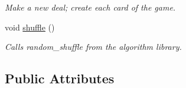 \begin{DoxyCompactItemize}
\begin{DoxyCompactList}\small\item\em \-Make a new deal; create each card of the game. \end{DoxyCompactList}\item 
\hypertarget{classDeck_ae5a1e52ab00ae5924f2bc6b730dba3eb}{void \hyperlink{classDeck_ae5a1e52ab00ae5924f2bc6b730dba3eb}{shuffle} ()}\label{classDeck_ae5a1e52ab00ae5924f2bc6b730dba3eb}

\begin{DoxyCompactList}\small\item\em \-Calls random\-\_\-shuffle from the algorithm library. \end{DoxyCompactList}\end{DoxyCompactItemize}
\subsection*{\-Public \-Attributes}
